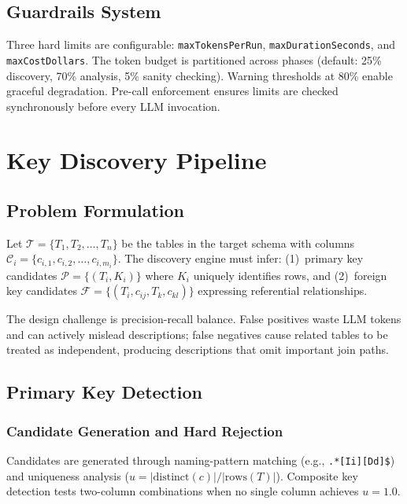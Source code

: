\documentclass[sigconf, nonacm]{acmart}
\begin{document}
\subsection{Guardrails System}

Three hard limits are configurable: \texttt{maxTokensPerRun}, \texttt{maxDurationSeconds}, and \texttt{maxCostDollars}. The token budget is partitioned across phases (default: 25\% discovery, 70\% analysis, 5\% sanity checking). Warning thresholds at 80\% enable graceful degradation. Pre-call enforcement ensures limits are checked synchronously before every LLM invocation.


\section{Key Discovery Pipeline}\label{sec:keydiscovery}

\subsection{Problem Formulation}

Let $\mathcal{T} = \{T_1, T_2, \ldots, T_n\}$ be the tables in the target schema with columns $\mathcal{C}_i = \{c_{i,1}, c_{i,2}, \ldots, c_{i,m_i}\}$. The discovery engine must infer: (1)~primary key candidates $\mathcal{P} = \{(T_i, K_i)\}$ where $K_i$ uniquely identifies rows, and (2)~foreign key candidates $\mathcal{F} = \{(T_i, c_{ij}, T_k, c_{kl})\}$ expressing referential relationships.

The design challenge is precision-recall balance. False positives waste LLM tokens and can actively mislead descriptions; false negatives cause related tables to be treated as independent, producing descriptions that omit important join paths.

\subsection{Primary Key Detection}

\subsubsection{Candidate Generation and Hard Rejection}

Candidates are generated through naming-pattern matching (e.g., \texttt{.*[Ii][Dd]\$}) and uniqueness analysis ($u = |\mathrm{distinct}(c)| / |\mathrm{rows}(T)|$). Composite key detection tests two-column combinations when no single column achieves $u = 1.0$.
\end{document}
